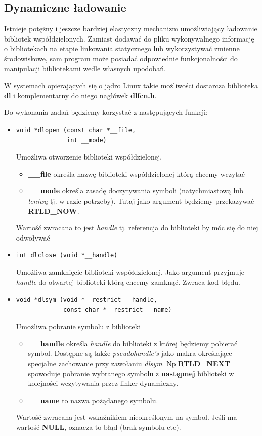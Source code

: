 \documentclass[12pt]{article}
\begin{document}
\subsection{Dynamiczne ładowanie}
Istnieje potężny i jeszcze bardziej elastyczny mechanizm umożliwiający ładowanie
bibliotek współdzielonych. Zamiast dodawać do pliku wykonywalnego informację o
bibliotekach na etapie linkowania statycznego lub wykorzystywać zmienne
środowiskowe, sam program może posiadać odpowiednie funkcjonalności do
manipulacji bibliotekami wedle własnych upodobań.

W systemach opierających się o jądro Linux takie możliwości dostarcza biblioteka
\textbf{dl} i komplementarny do niego nagłówek \textbf{dlfcn.h}.

Do wykonania zadań będziemy korzystać z następujących funkcji:
\begin{itemize}
\item
\begin{lstlisting}
void *dlopen (const char *__file, 
              int __mode)
\end{lstlisting}
  Umożliwa otworzenie biblioteki współdzielonej.
  \begin{itemize}
  \item \textbf{\_\_file} określa nazwę biblioteki współdzielonej którą chcemy
    wczytać
  \item \textbf{\_\_mode} określa zasadę doczytywania symboli (natychmiastową
    lub \textit{leniwą} tj. w razie potrzeby). Tutaj jako argument będziemy
    przekazywać \textbf{RTLD\_NOW}.
  \end{itemize}
  Wartość zwracana to jest \textit{handle} tj. referencja do biblioteki by móc
  się do niej odwoływać
\item
\begin{lstlisting}
int dlclose (void *__handle)
\end{lstlisting}
  Umożliwa zamknięcie biblioteki współdzielonej. Jako argument przyjmuje
  \textit{handle} do otwartej biblioteki którą chcemy zamknąć. Zwraca kod błędu.
\item
\begin{lstlisting}
void *dlsym (void *__restrict __handle, 
             const char *__restrict __name)
\end{lstlisting}
  Umożliwa pobranie symbolu z biblioteki
  \begin{itemize}
  \item \textbf{\_\_handle} określa \textit{handle} do biblioteki z której
    będziemy pobierać symbol. Dostępne są także \textit{pseudohandle's} jako
    makra określające specjalne zachowanie przy zawołaniu \textit{dlsym}. Np
    \textbf{RTLD\_NEXT} spowoduje pobranie wybranego symbolu z
    \textbf{następnej} biblioteki w kolejności wczytywania przez linker
    dynamiczny.
  \item \textbf{\_\_name} to nazwa pożądanego symbolu.
  \end{itemize}
  Wartość zwracana jest wskaźnikiem nieokreślonym na symbol. Jeśli ma
  wartość \textbf{NULL}, oznacza to błąd (brak symbolu etc).\\


\end{itemize}
\end{document}
